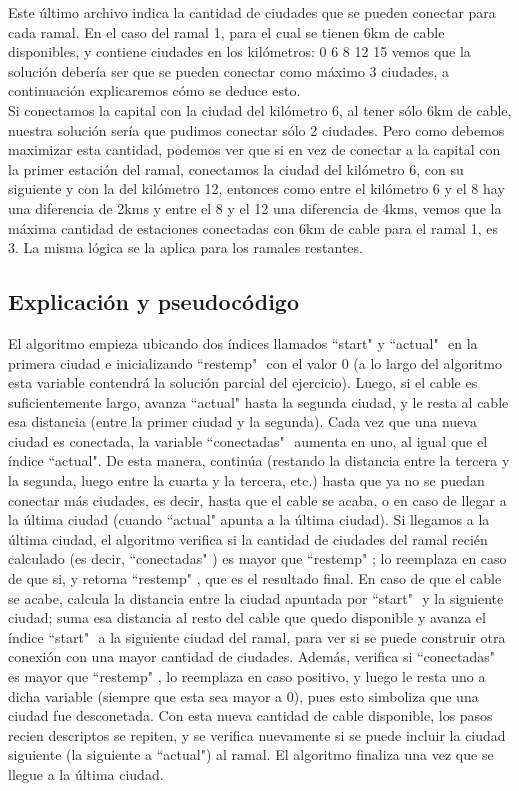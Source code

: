 Este último archivo indica la cantidad de ciudades que se pueden conectar para cada ramal. En el caso del ramal 1, para el cual se tienen 6km de cable disponibles, y contiene ciudades en los kilómetros: 0 6 8 12 15 vemos que la solución debería ser que se pueden conectar como máximo 3 ciudades, a continuación explicaremos cómo se deduce esto.\\

Si conectamos la capital con la ciudad del kilómetro 6, al tener sólo 6km de cable, nuestra solución sería que pudimos conectar sólo 2 ciudades. Pero como debemos maximizar esta cantidad, podemos ver que si en vez de conectar a la capital con la primer estación del ramal, conectamos la ciudad del kilómetro 6, con su siguiente y con la del kilómetro 12, entonces como entre el kilómetro 6 y el 8 hay una diferencia de 2kms y entre el 8 y el 12 una diferencia de 4kms, vemos que la máxima cantidad de estaciones conectadas con 6km de cable para el ramal 1, es 3. La misma lógica se la aplica para los ramales restantes.\\

\subsection{Explicación y pseudocódigo}

El algoritmo empieza ubicando dos índices llamados ``start" $ $y ``actual" $ $ en la primera ciudad e inicializando ``restemp" $ $ con el valor 0 (a lo largo del algoritmo esta variable contendrá la solución parcial del ejercicio). Luego, si el cable es suficientemente largo, avanza ``actual"$ $ hasta la segunda ciudad, y le resta al cable esa distancia (entre la primer ciudad y la segunda). Cada vez que una nueva ciudad es conectada, la variable ``conectadas" $ $ aumenta en uno, al igual que el índice ``actual"$ $. De esta manera, continúa (restando la distancia entre la tercera y la segunda, luego entre la cuarta y la tercera, etc.) hasta que ya no se puedan conectar más ciudades, es decir, hasta que el cable se acaba, o en caso de llegar a la última ciudad (cuando ``actual"$ $ apunta a la última ciudad).  Si llegamos a la última ciudad, el algoritmo verifica si la cantidad de ciudades del ramal recién calculado (es decir, ``conectadas" $ $) es mayor que ``restemp" $ $; lo reemplaza en caso de que si, y retorna ``restemp" $ $, que es el resultado final. En caso de que el cable se acabe, calcula la distancia entre la ciudad apuntada por ``start" $ $ y la siguiente ciudad; suma esa distancia al resto del cable que quedo disponible y avanza el índice ``start" $ $ a la siguiente ciudad del ramal, para ver si se puede construir otra conexión con una mayor cantidad de ciudades. Además, verifica si ``conectadas" $ $ es mayor que ``restemp" $ $, lo reemplaza en caso positivo, y luego le resta uno a dicha variable (siempre que esta sea mayor a 0), pues esto simboliza que una ciudad fue desconetada. Con esta nueva cantidad de cable disponible, los pasos recien descriptos se repiten, y se verifica nuevamente si se puede incluir la ciudad siguiente (la siguiente a ``actual"$ $) al ramal. El algoritmo finaliza una vez que se llegue a la última ciudad.

